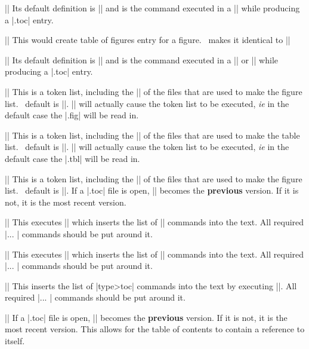 \mbr
\ext\@|\dssshtocout|
\nbr
Its default definition is
|\def\dssshtocout{\string\dssshtoc}| and is 
the command executed in a |\dssshead| while producing a |.toc| entry. 


\mbr
\ext\@||
\nbr
This would create table of figures  entry for a figure.
\intex\ makes it identical to |\shtoc|

\mbr
\ext\@|\figtocout|
\nbr
Its default definition is
|\def\figtocout{\string\figtoc}| and is 
the command executed in a |\figureform| or 
|\figureinsert| while producing a |.toc| entry. 


\mbr
\ext\@|| 
\nbr
This is a token list, including the || of the files that are
used to make the figure list. \intex\ default is 
||. |\the{}| will actually cause the
token list to be executed, {\it ie} in the default case the |\jobname.fig|
will be read in.


\mbr
\ext\@||
\nbr
This is a token list, including the || of the files that are
used to make the table list. \intex\ default is 
||. |\the{}| will actually cause the
token list to be executed, {\it ie} in the default case the |\jobname.tbl|
will be read in.

\mbr
\ext\@||
\nbr
This is a token list, including the || of the files that are
used to make the figure list. \intex\ default is 
||. If a |\jobname.toc| file is open,
|\newtocfile| becomes the {\bf previous} version. If it is not, it is the
most recent version.


\mbr
\ext\@|\makefiglist|
\nbr
This executes |\the{}| which inserts 
the list of |\figtoc| commands into the text.
All required |\beginlist ... \endlist| commands should
be put around it.

\mbr
\ext\@|\maketbllist|
\nbr
This executes |\the{}| which inserts 
the list of |\tbltoc| commands into the text.
All required |\beginlist ... \endlist| commands should
be put around it.

\mbr
\ext\@|\maketoclist|
\nbr
This inserts the list of |\<type>toc| commands into the text by executing
|\the{}|. All required |\beginlist ... \endlist| commands should
be put around it.

\mbr
\ext\@|\newtocfile|
\nbr
If a |\jobname.toc| file is open,
|\newtocfile| becomes the {\bf previous} version. If it is not, it is the
most recent version. This allows for the table of contents to contain a
reference to itself.

